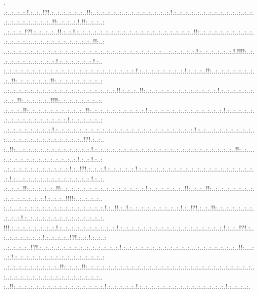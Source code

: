 \documentclass[paper=a4, fontsize=11pt]{scrartcl} %
\numberwithin{equation}{section} %
\numberwithin{figure}{section} %
\numberwithin{table}{section} %
\begin{document}
.\\.:..:..:..:.!.:..:..!?!.:..:..:..:..:..:..!!:..:..:..:..:..:..:..:..:..:..:..:..:..:.!.:..:..:..:..:..:..:..:..:..:..:..:..:..:..:..:..:..:..:..:..:..:..!!:..:..:..:.!.!!:..:..:..:\\..:..:..:..!?!.:..:..:..:..!!.:..:.!.:..:..:..:..:..:..:..:..:..:..:..:..:..:..:..:..:..:..:..:..!!:..:..:..:..:..:..:..:..:..:..:..:..:..:..:..:..:..:..:..:..:..:..:..:..:..!!:..:\\..:..:..:..:..:..:..:..:..:..:..:..:..:..:..:..:..:..:..:..:..:..:..:..:..:..:..:....:..:..:..:..:.!.:..:..:..:..:..:.!.!!!!:..:..:..:..:..:..:..:..:..:..:.!.:..:..:..:..:..:.!.:..\\:..:..:..:..:..:..:..:..:..:..:..:..:..:..:..:..:..:..:..:..:..:..:.!.:..:..:..:..:..:..:..:.!.:..:..:..!!:..:..:..:..:..:..:..:..:..!!:..:..:..:..:..:..!!:..:..:..:..:..:..:..:..:\\..:..:..:..:..:..:..:..:..:..:..:..:..:..:..:..:..:..:..:.!!.:..:..:..!!:..:..:..:..:..:..:..:..:..:..:..:..:.!.:..:..:..:..:..:..:..:..!!:..:..:..:..:..!!!!:..:..:..:..:..:..:..:.\\.:..:..:..!!:..:..:..:..:..:..:..:..:..:..!!:..:..:..:..:..:..:..:..:..:.!.:..:..:..:..:..:..:..:..:..:..:..:..:.!.:..:..:..:..:..:..:..:..:..:..:..:..:..:..:..:.!.:..:..:..:..:..:\\..:..:..:..:..:..:..:..:.!.:..:..:..:..:..:..:..:..:..:..:..:..:..:..:..:..:..:..:..:..:..:..:..:.!.:..:....:..:..:..:..:..:..:..:....:..:..:..:..:..:..:..:..:..:..:..:..!?!.:..:..\\:..!!:....:..:..:..:..:..:..:..:..:..:..:..:.!.:..:..:..:..:..:..:..:..:..:..:..:..:..:..:..:..:..:..:..:..:..:..:..:..!!:..:....:..:..:..:..:..:..:..:..:..:..:..:..:.!.:..:.!.:..:\\..:..:..:..:..:..:..:..:..:..:..:.!.:..!?!.:..:..:.!.:..:..:..:..:.!.:..:..:..:..:..:..:..:..:..:..:..:..:..:..:..:..:..:..:..:..:.!.:....:..:..:..:..:..:..:..:..:..:..:..:.!.:..:.\\.:..:..:..!!:..:..:..:..:..!!:..:..:..:..:..:..:..:..:..:..:..:..:..:..:.!.:..:..:..:..:..:..!!:..:..:..!!:..:..:..:..:..:..:..:..:..:..:..:..:..:..:.!.:..:..:..!!!!:..:..:..:..:..\\:..:....:..:..:..:..:..:..:..:..:..:..:..:..:..:..:.!.:..!!.:..!.:..:..:..:..:..:..:..:..:.!.:..!?!.:..:..!!:..:..:..:..:..:..:..:..:..:.!.:..:..:..:..:..:..:..:..:..:..:..:..:..:.\\!!!.:..:..:..:..:..:..:..:.!.:..:..:..:..:..:..:..:..:..:.!.:..:..:..:..:..:..:..:..:..:..:..:..:..:..:..:..:..:.!.:..:..!?!.:..:..:..:..:..:..:..:.!.:..:..:..:..!?!.:..:.!.:..:..:\\..:..:..:..:..!?!.:..:..:..:..:..:..:..:..:..:..:..:..:..:.!.:..:..:..:..:..:..:..:..:..:..:..:....:..:..:..:..:..:..:..!!:....:..:.!.:..:..:..:..:..:..:..:..:..:..:..:..:..:..:..:\\..:..:..:..:..:..:..:..:..:..!!:..:..:..!!:..:..:..:..:..:..:..:..:..:..:..:..:..:..:..:..:..:..:..:..:..:..:..:..:..:..:..:..:..:..:..:..:..:..:..:..:..:..:..:..:..:..:..:..:..:..\\:..!!:..:..:..:..:..:..:..:..:..:..:..:..:..:..:..:.!.:..:..:..:..:.!.:..:..:..:..:..:..:..:..:..:..:..:..:..:..:.!.:..:..:..:.
\end{document}
